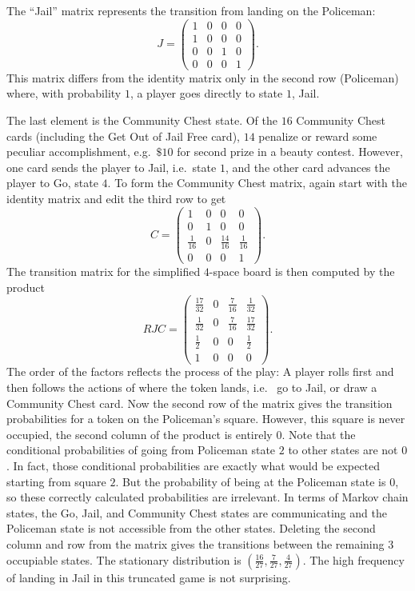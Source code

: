 \documentclass[12pt]{article}
\begin{document}
The ``Jail'' matrix represents the transition from landing on the
Policeman:
\[
    J =
    \begin{pmatrix}
        1 & 0 & 0 & 0 \\
        1 & 0 & 0 & 0 \\
        0 & 0 & 1 & 0 \\
        0 & 0 & 0 & 1
    \end{pmatrix}
    .
\] This matrix differs from the identity matrix only in the second row (Policeman)
where, with probability \( 1 \), a player goes directly to state \( 1 \),
Jail.

The last element is the Community Chest state.  Of the \( 16 \)
Community Chest cards (including the Get Out of Jail Free card), \( 14 \)
penalize or reward some peculiar accomplishment, e.g.\ \( \$10 \) for
second prize in a beauty contest.  However, one card sends the player to
Jail, i.e.\ state \( 1 \), and the other card advances the player to Go,
state \( 4 \).  To form the Community Chest matrix, again start with the
identity matrix and edit the third row to get
\[
    C =
    \begin{pmatrix}
        1 & 0 & 0 & 0 \\
        0 & 1 & 0 & 0 \\
        \frac{1}{16} & 0 & \frac{14}{16} & \frac{1}{16} \\
        0 & 0 & 0 & 1
    \end{pmatrix}
    .
\] The transition matrix for the simplified \( 4 \)-space board is then
computed by the product
\[
    RJC =
    \begin{pmatrix}
        \frac{17}{32} & 0 & \frac{7}{16} & \frac{1}{32} \\
        \frac{1}{32} & 0 & \frac{7}{16} & \frac{17}{32} \\
        \frac{1}{2} & 0 & 0 & \frac{1}{2} \\
        1 & 0 & 0 & 0
    \end{pmatrix}
    .
\] The order of the factors reflects the process of the play:  A player
rolls first and then follows the actions of where the token lands, i.e.\
%
%
go to Jail, or draw a Community Chest card.  Now the second row of the
matrix gives the transition probabilities for a token on the Policeman's
square.  However, this square is never occupied, the second column of
the product is entirely \( 0 \).  Note that the conditional
probabilities of going from Policeman state \( 2 \) to other states are
not \( 0 \).  In fact, those conditional probabilities are exactly what
would be expected starting from square \( 2 \).  But the probability of
being at the Policeman state is \( 0 \), so these correctly calculated
probabilities are irrelevant.  In terms of Markov chain states, the Go,
Jail, and Community Chest states are communicating and the Policeman
state is not accessible from the other states.  Deleting the second
column and row from the matrix gives the transitions between the
remaining \( 3 \) occupiable states.  The stationary distribution is \(
(\frac{16}{27}, \frac{7}{27}, \frac{4}{27}) \).  The high frequency of
landing in Jail in this truncated game is not surprising.
\end{document}
